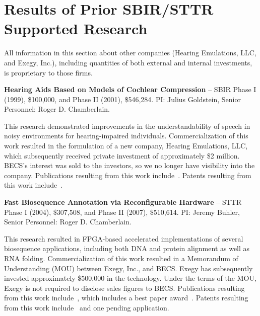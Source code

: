 \section{Results of Prior SBIR/STTR Supported Research}
\label{sec:prior}

All information in this section
about other companies (Hearing Emulations, LLC, and
Exegy, Inc.), including quantities of both external and internal investments,
is proprietary to those firms.

\medskip

\noindent
{\bf Hearing Aids Based on Models of Cochlear Compression} --
SBIR Phase I (1999), \$100,000, and Phase II (2001), \$546,284.
PI: Julius Goldstein, Senior Personnel: Roger D. Chamberlain.

This research demonstrated improvements in the understandability of speech in
noisy environments for hearing-impaired individuals.
Commercialization of this work resulted in the formulation of a new
company, Hearing Emulations, LLC, which subsequently received private
investment of approximately \$2 million.
BECS's interest was sold to the investors, so we no longer
have visibility into the company.
Publications resulting from this work
include~\cite{ccd+02a,ccd+02b,chmw03,cgi03,Gold06,gogv03b,gogv03,gvc01,gvcgi00}.
Patents resulting from this work
include~\cite{Goldstein05a,Goldstein05b,gc03}.

\medskip

\noindent
{\bf Fast Biosequence Annotation via Reconfigurable Hardware} --
STTR Phase I (2004), \$307,508, and Phase II (2007), \$510,614.
PI: Jeremy Buhler, Senior Personnel: Roger D. Chamberlain.

This research resulted in FPGA-based accelerated implementations of
several biosequence applications, including both DNA and protein alignment
as well as RNA folding.
Commercialization of this work resulted in a Memorandum of Understanding (MOU)
between Exegy, Inc., and BECS.  Exegy has subsequently invested
approximately \$500,000 in the technology.
Under the terms of the MOU, Exegy
is not required to disclose sales figures to BECS.
Publications resulting from this work
include~\cite{bljc07,dlmbc10,hjlbc07,jbc08,jlbc07b,jlbc07a,jlbhc08,jbc09,jbc10b,jbc10a,kbcfgl04,kbcfgjl07,lbc05,lbc09},
which includes a best paper award~\cite{jbc10b}.
Patents resulting from this work
include~\cite{Buhler11,Buhler13,Buhler17} and one pending application.
